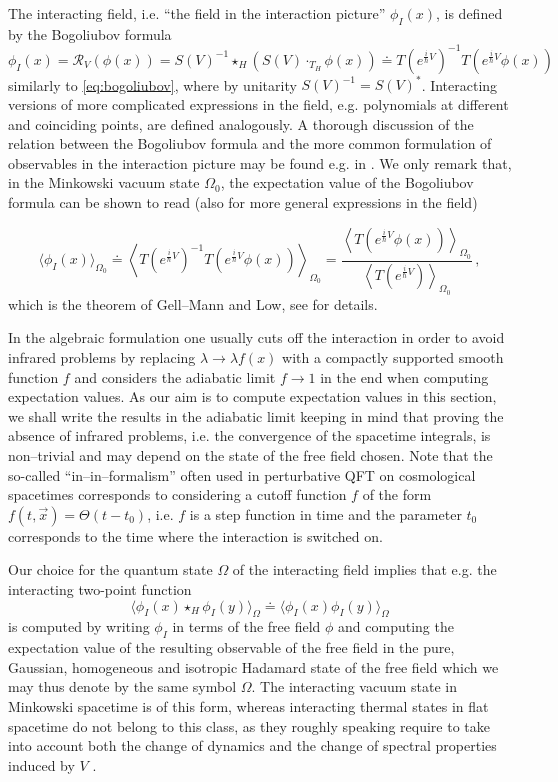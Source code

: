 \documentclass[a4paper,10pt,twoside]{article}
\numberwithin{equation}{section}
\newcounter{and}
\theoremstyle{plain}
\theoremstyle{definition}
\begin{document}
The interacting field, i.e. ``the field in the interaction picture'' $\phi_I(x)$, is defined by the Bogoliubov formula
\begin{equation}\label{eq_bogoliubov}
\phi_I(x)=\mathcal{R}_V(\phi(x))=S(V)^{-1}\star_H\left(S(V)\cdot_{T_H} \phi(x)\right)\doteq T(e^{\frac{i}{\hbar} V})^{-1} T(e^{\frac{i}{\hbar} V}\phi(x))\,
\end{equation}
similarly to \eqref{eq:bogoliubov}, where by unitarity $S(V)^{-1}=S(V)^*$. Interacting versions of more complicated expressions in the field, e.g. polynomials at different and coinciding points, are defined analogously. A thorough discussion of the relation between the Bogoliubov formula and the more common formulation of observables in the interaction picture may be found e.g. in \cite[Section 3.1]{Lindner:2013ila}. We only remark that, in the Minkowski vacuum state $\Omega_0$, the expectation value of the Bogoliubov formula can be shown to read (also for more general expressions in the field)

$$\langle \phi_I(x)\rangle_{\Omega_0} \doteq \left\langle T(e^{\frac{i}{\hbar} V})^{-1}T(e^{\frac{i}{\hbar} V}\phi(x))\right\rangle_{\Omega_0}=\frac{\left\langle T(e^{\frac{i}{\hbar} V}\phi(x))\right\rangle_{\Omega_0}}{\left\langle T(e^{\frac{i}{\hbar} V}) \right\rangle_{\Omega_0}}\,,$$
which is the theorem of Gell--Mann and Low, see \cite{Duetsch:1996eh, Duetsch:2000nh} for details.

In the algebraic formulation one usually cuts off the interaction in order to avoid infrared problems by replacing $\lambda\to \lambda f(x)$ with a compactly supported smooth function $f$ and considers the adiabatic limit $f\to 1$ in the end when computing expectation values. As our aim is to compute expectation values in this section, we shall write the results in the adiabatic limit keeping in mind that proving the absence of infrared problems, i.e. the convergence of the spacetime integrals, is non--trivial and may depend on the state of the free field chosen. Note that the so-called ``in--in--formalism'' often used in perturbative QFT on cosmological spacetimes corresponds to considering a cutoff function $f$ of the form $f(t,\vec{x}) = \Theta(t-t_0)$, i.e. $f$ is a step function in time and the parameter $t_0$ corresponds to the time where the interaction is switched on.


Our choice for the quantum state $\Omega$ of the interacting field implies that e.g. the interacting two-point function 
$$\langle \phi_I(x)\star_H\phi_I(y)\rangle_\Omega\doteq \langle \phi_I(x)\phi_I(y)\rangle_\Omega$$
is computed by writing $\phi_I$ in terms of the free field $\phi$ and computing the expectation value of the resulting observable of the free field in the pure, Gaussian, homogeneous and isotropic Hadamard state of the free field which we may thus denote by the same symbol $\Omega$. The interacting vacuum state in Minkowski spacetime is of this form, whereas interacting thermal states in flat spacetime do not belong to this class, as they roughly speaking require to take into account both the change of dynamics and the change of spectral properties induced by $V$ \cite{Fredenhagen:2013cna}.
\end{document}
